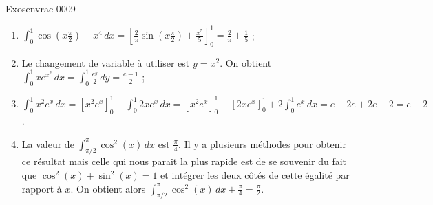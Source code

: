 \begin{corrige}{Exosenvrac-0009}
  \begin{enumerate}
  \item $\displaystyle \int_0^1 \cos\left(x\frac{\pi}{2}\right) + x^4 \, dx = \left[\frac{2}{\pi}\sin\left(x\frac{\pi}{2}\right)+ \frac{x^5}{5}\right]_{0}^{1}= \frac{2}{\pi}+\frac{1}{5}$ ; 
  \item Le changement de variable \`a utiliser est $y=x^2$. On obtient $\displaystyle \int_{0}^1 xe^{x^2} \, dx = \int _{0}^{1} \frac{e^y}{2}\,dy = \frac{e-1}{2}$ ; 
  \item $\displaystyle \int_{0}^1 x^2e^{x} \, dx= \left[x^2e^{x} \right]_0^1- \int_{0}^1 2xe^{x} \, dx=\left[x^2e^{x} \right]_0^1 - \left[2xe^{x} \right]_0^1 + 2\int_{0}^1 e^{x} \, dx = e - 2e + 2 e - 2 = e-2$. 
  \item La valeur de $\displaystyle \int_{\pi/2}^{\pi} \cos^2(x)\, dx$ est $\displaystyle \frac{\pi}{4}$. Il y a plusieurs m\'ethodes pour obtenir ce r\'esultat mais celle qui nous parait la plus rapide est de se souvenir du fait que $\cos^2(x)+\sin^2(x)=1$ et int\'egrer les deux c\^ot\'es de cette \'egalit\'e par rapport \`a $x$. On obtient alors $\displaystyle \int_{\pi/2}^{\pi} \cos^2(x)\, dx + \frac{\pi}{4}= \frac{\pi}{2}$. 
  \end{enumerate}

\end{corrige}
